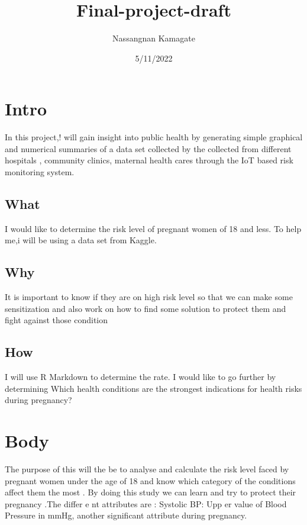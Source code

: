 \documentclass[
]{article}
\title{Final-project-draft}
\author{Nassangnan Kamagate}
\date{5/11/2022}
\begin{document}
\maketitle

\hypertarget{intro}{%
\section{Intro}\label{intro}}

In this project,! will gain insight into public health by generating
simple graphical and numerical summaries of a data set collected by the
collected from different hospitals , community clinics, maternal health
cares through the IoT based risk monitoring system.

\hypertarget{what}{%
\subsection{What}\label{what}}

I would like to determine the risk level of pregnant women of 18 and
less. To help me,i will be using a data set from Kaggle.

\hypertarget{why}{%
\subsection{Why}\label{why}}

It is important to know if they are on high risk level so that we can
make some sensitization and also work on how to find some solution to
protect them and fight against those condition

\hypertarget{how}{%
\subsection{How}\label{how}}

I will use R Markdown to determine the rate. I would like to go further
by determining Which health conditions are the strongest indications for
health risks during pregnancy?

\hypertarget{body}{%
\section{Body}\label{body}}

The purpose of this will the be to analyse and calculate the risk level
faced by pregnant women under the age of 18 and know which category of
the conditions affect them the most . By doing this study we can learn
and try to protect their pregnancy .The differ e nt attributes are :
Systolic BP: Upp er value of Blood Pressure in mmHg, another significant
attribute during pregnancy.
\end{document}
